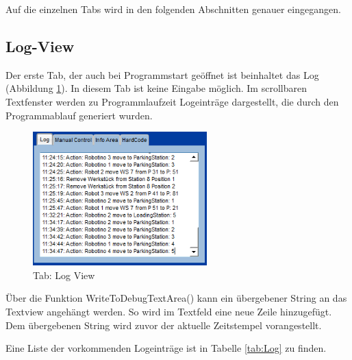 Auf die einzelnen Tabs wird in den folgenden Abschnitten genauer eingegangen. 

\subsection{Log-View}

Der erste Tab, der auch bei Programmstart geöffnet ist beinhaltet das Log (Abbildung \ref{fig:Log}). In diesem Tab ist keine Eingabe möglich. Im scrollbaren Textfenster werden zu Programmlaufzeit Logeinträge dargestellt, die durch den Programmablauf generiert wurden. 

\begin{figure}[htb]
    \centering
    \includegraphics[width=0.6\textwidth]{Abbildungen/Log.png}
    \caption{Tab: Log View}		
    \label{fig:Log}
\end{figure}

Über die Funktion WriteToDebugTextArea() kann ein übergebener String an das Textview angehängt werden. So wird im Textfeld eine neue Zeile hinzugefügt. Dem übergebenen String wird zuvor der aktuelle Zeitstempel vorangestellt. 

Eine Liste der vorkommenden Logeinträge ist in Tabelle \ref{tab:Log} zu finden. 

